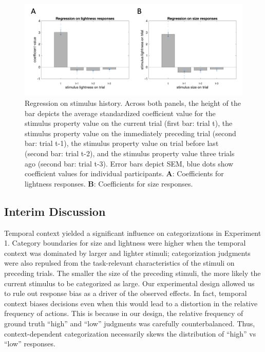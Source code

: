 \documentclass[a4paper, nobind]{templates/ociamthesis}
\begin{document}
\begin{figure}

{\centering \includegraphics[width=1\linewidth]{figures/cat-reg-a} 

}

\caption[Experiment 1, Regression of responses on stimulus history]{Regression on stimulus history. Across both panels, the height of the bar depicts the average standardized coefficient value for the stimulus property value on the current trial (first bar: trial t), the stimulus property value on the immediately preceding trial (second bar: trial t-1), the stimulus property value on trial before last (second bar: trial t-2), and the stimulus property value three trials ago (second bar: trial t-3). Error bars depict SEM, blue dots show coefficient values for individual participants. $\textbf{A:}$ Coefficients for lightness responses. $\textbf{B:}$ Coefficients for size responses.}\label{fig:cat-reg-a}
\end{figure}

\hypertarget{interim-discussion-4}{%
\subsection{Interim Discussion}\label{interim-discussion-4}}

Temporal context yielded a significant influence on categorizations in Experiment 1. Category boundaries for size and lightness were higher when the temporal context was dominated by larger and lighter stimuli; categorization judgments were also repulsed from the task-relevant characteristics of the stimuli on preceding trials. The smaller the size of the preceding stimuli, the more likely the current stimulus to be categorized as large. Our experimental design allowed us to rule out response bias as a driver of the observed effects. In fact, temporal context biases decisions even when this would lead to a distortion in the relative frequency of actions. This is because in our design, the relative frequency of ground truth ``high'' and ``low'' judgments was carefully counterbalanced. Thus, context-dependent categorization necessarily skews the distribution of ``high'' vs ``low'' responses.
\end{document}
